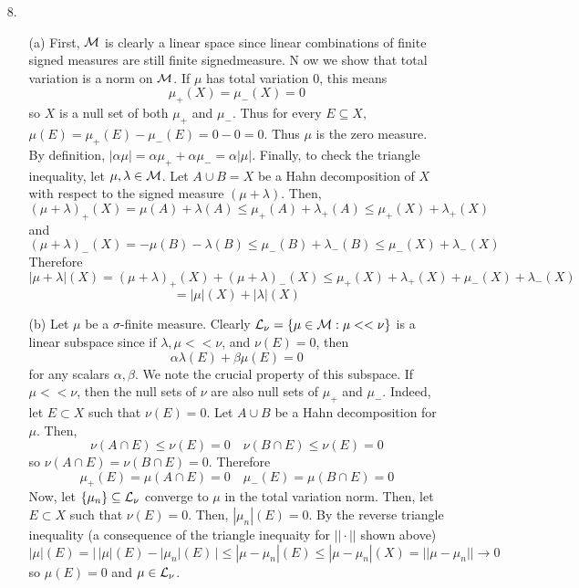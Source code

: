 \begin{itemize}
\item[8.] \begin{itemize}
\item[(a)] First, $\mathcal{M}$ is clearly a linear space since linear combinations of finite signed measures are still finite signedmeasure. N ow we show that total variation is a norm on $\mathcal{M}$. If $\mu$ has total variation 0, this means
	\[ \mu_+(X) = \mu_-(X) =0 \]
so $X$ is a null set of both $\mu_+$ and $\mu_-$. Thus for every $E \subseteq X$, $\mu(E) = \mu_+(E)-\mu_-(E) = 0-0=0$. Thus $\mu$ is the zero measure. By definition, $|\alpha \mu| = \alpha \mu_+ + \alpha \mu_- = \alpha|\mu|$. Finally, to check the triangle inequality, let $\mu,\lambda \in \mathcal{M}$. Let $A \cup B = X$ be a Hahn decomposition of $X$ with respect to the signed measure $(\mu+ \lambda)$. Then,
	\[ (\mu+\lambda)_+(X) = \mu(A) + \lambda(A) \le \mu_+(A) + \lambda_+(A) \le \mu_+(X) + \lambda_+(X) \]
and
	\[ (\mu+\lambda)_-(X) = -\mu(B) - \lambda(B) \le \mu_-(B) + \lambda_-(B) \le \mu_-(X) + \lambda_-(X) \]
Therefore
	\[ |\mu+\lambda|(X) = (\mu+\lambda)_+(X) + (\mu+\lambda)_-(X) \le \mu_+(X)+ \lambda_+(X) + \mu_-(X)+ \lambda_-(X)\] \[= |\mu|(X) + |\lambda|(X) \]

\item[(b)] Let $\mu$ be a $\sigma$-finite measure. Clearly $\mathcal{L}_\nu = \{ \mu \in \mathcal{M} : \mu << \nu \}$ is a linear subspace since if $\lambda,\mu << \nu$, and $\nu(E) =0$, then
	\[ \alpha \lambda(E) + \beta \mu(E) = 0 \]
for any scalars $\alpha,\beta$. We note the crucial property of this subspace. If $\mu << \nu$, then the null sets of $\nu$ are also null sets of $\mu_+$ and $\mu_-$. Indeed, let $E \subset X$ such that $\nu(E)=0$. Let $A \cup B$ be a Hahn decomposition for $\mu$. Then,
	\[ \nu(A \cap E) \le \nu(E) =0 \quad \nu(B \cap E) \le \nu(E) =0 \]
so $\nu(A \cap E) = \nu(B \cap E) = 0$. Therefore
	\[ \mu_+(E) = \mu(A \cap E) = 0 \quad \mu_-(E) = \mu(B \cap E) = 0 \]
Now, let $\{\mu_n\} \subseteq \mathcal{L}_\nu$ converge to $\mu$ in the total variation norm. Then, let $E \subset X$ such that $\nu(E)=0$. Then, $|\mu_n|(E)=0$. By the reverse triangle inequality (a consequence of the triangle inequaity for $||\cdot||$ shown above)
	\[|\mu|(E) = | \, |\mu|(E) - |\mu_n|(E) \, | \le |\mu - \mu_n|(E) \le |\mu-\mu_n|(X) = ||\mu-\mu_n|| \to 0 \]
so $\mu(E) = 0$ and $\mu \in \mathcal{L}_\nu$.


\end{itemize}
\end{itemize}
